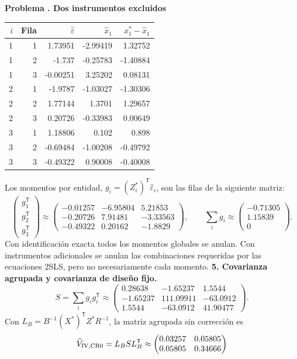 \documentclass[11pt,a4paper]{article}
\newcommand{\T}{^{\mathsf T}}
\theoremstyle{definition}
\newcounter{problema}
\newenvironment{resuelto}[1]{\refstepcounter{problema}\par\medskip\Needspace{6\baselineskip}\textbf{Problema \theproblema. #1}\par}{\par\medskip}
\newcommand{\eps}{\varepsilon}
\begin{document}
\begin{resuelto}{Dos instrumentos excluidos}
\begin{center}\small
\begin{tabular}{rrrrr}
\toprule
$i$&Fila&$\widehat\eps$&$\widehat x_1$&$x_1^*-\widehat x_1$\\
\midrule
1&1&1.73951&-2.99419&1.32752\\
1&2&-1.737&-0.25783&-1.40884\\
1&3&-0.00251&3.25202&0.08131\\
2&1&-1.9787&-1.03027&-1.30306\\
2&2&1.77144&1.3701&1.29657\\
2&3&0.20726&-0.33983&0.00649\\
3&1&1.18806&0.102&0.898\\
3&2&-0.69484&-1.00208&-0.49792\\
3&3&-0.49322&0.90008&-0.40008\\
\bottomrule
\end{tabular}
\end{center}
Los momentos por entidad, $g_i=(Z_i^*)\T\widehat\eps_i$, son las filas de la siguiente matriz:
\[
\begin{pmatrix}g_1\T\\g_2\T\\g_3\T\end{pmatrix}\approx\begin{pmatrix}
-0.01257&-6.95804&5.21853\\-0.20726&7.91481&-3.33563\\-0.49322&0.20162&-1.8829
\end{pmatrix},\qquad \sum_i g_i\approx\begin{pmatrix}
-0.71305\\1.15839\\0
\end{pmatrix}.
\]
Con identificación exacta todos los momentos globales se anulan. Con instrumentos adicionales se anulan las combinaciones requeridas por las ecuaciones 2SLS, pero no necesariamente cada momento.
\textbf{5. Covarianza agrupada y covarianza de diseño fijo.}
\[
S=\sum_i g_ig_i\T\approx\begin{pmatrix}
0.28638&-1.65237&1.5544\\-1.65237&111.09911&-63.0912\\1.5544&-63.0912&41.90477
\end{pmatrix}.
\]
Con $L_B=B^{-1}(X^*)\T Z^*R^{-1}$, la matriz agrupada sin corrección es
\[
\widehat V_{\rm IV,CR0}=L_BSL_B\T\approx\begin{pmatrix}
0.03257&0.05805\\0.05805&0.34666

\end{pmatrix}\]
\end{resuelto}
\end{document}
